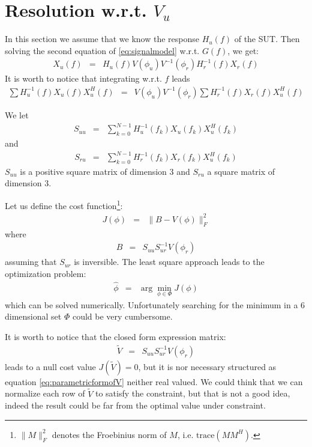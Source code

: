 \documentclass[a4paper, 12pt]{report}
\newcommand{\trace}[1]{\mathrm{trace}\left( #1 \right)}
\begin{document}
\section{Resolution w.r.t. $V_{u}$}
In this section we assume that we know the response $H_{u}(f)$ of the SUT. Then solving the second equation of \eqref{eq:signalmodel} w.r.t. $G(f)$, we get:
\begin{eqnarray*}
X_{u}(f)&=&H_{u}(f)V(\phi_{u})V ^{-1}(\phi_{r})H_{r}^{-1}(f)X_{r}(f)
\end{eqnarray*}
It is worth to notice that integrating w.r.t. $f$ leads
\begin{eqnarray*}
\sum H_{u}^{-1}(f)X_{u}(f)X_{u}^{H}(f)&=&V(\phi_{u})V^{-1}(\phi_{r})\sum H_{r}^{-1}(f)X_{r}(f)X_{u}^{H}(f)
\end{eqnarray*}

We let 
\begin{eqnarray*}
S_{uu}&=&\sum_{k=0}^{N-1} H_{u}^{-1}(f_{k})X_{u}(f_{k})X_{u}^{H}(f_{k})
\end{eqnarray*}
and 
\begin{eqnarray*}
S_{ru}&=&\sum_{k=0}^{N-1} H_{r}^{-1}(f_{k})X_{r}(f_{k})X_{u}^{H}(f_{k})
\end{eqnarray*}
$S_{uu}$ is a positive square matrix of dimension $3$ and $S_{ru}$ a square matrix of dimension $3$.

Let us define the cost function\footnote{$\|M\|^{2}_{F}$ denotes the Froebinius norm of $M$, i.e. $\trace{MM^{H}}$. }:
\begin{eqnarray*}
J(\phi) &=&  \|B - V(\phi)\|_{F}^{2}
\end{eqnarray*}
where
\begin{eqnarray*}
B &=& S_{uu} S_{ur}^{-1}V(\phi_{r})
\end{eqnarray*}
assuming that $S_{ur}$ is inversible. The least square approach leads to the optimization problem:
\begin{eqnarray}
 \label{eq:hatphi}
\hat \phi &=& \arg\min_{\phi\in\Phi} J(\phi)
\end{eqnarray}
which can be solved numerically. Unfortunately searching for the minimum in a 6 dimensional set $\Phi$ could be very cumbersome.

It is worth to notice that the closed form expression matrix:
\begin{eqnarray*}
\tilde V &=&S_{uu}S_{ur}^{-1}V(\phi_{r})
\end{eqnarray*}
leads to a null cost value $J(\tilde V)=0$, but it is nor necessary structured as equation \eqref{eq:parametricformofV} neither real valued.  We could think that we can normalize each row of $\tilde V$ to satisfy the constraint, but that is not a good idea, indeed the result could be far from the optimal value under constraint. 
\end{document}

